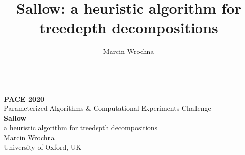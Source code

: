 \documentclass[aspectratio=169]{beamer}
\title[Sallow]
{Sallow: a heuristic algorithm for treedepth decompositions}
\author%
{Marcin Wrochna}
\institute[Oxford] %
{
	\quad Durham University \qquad\qquad\qquad
	University of Oxford, UK
}
\date[]{}
\begin{document}
	

	
{
\begin{frame}
	\ \\
	{\bfseries\color{pace} PACE 2020}\\[0.4ex]
	{\color{pace}\small\textsf{Parameterized Algorithms \& Computational Experiments Challenge}}\\[3.5em]
		
	{\fontsize{16}{19}\bfseries\color{myblue} Sallow}\\[0.4ex]
	{\color{myblue}a heuristic algorithm for treedepth decompositions}\\[2.5em]
	
	{\flafamily\small Marcin Wrochna}\\[0.4ex]
	{\flafamily\small University of Oxford, UK}\\[3em]
\end{frame}
}
\end{document}
